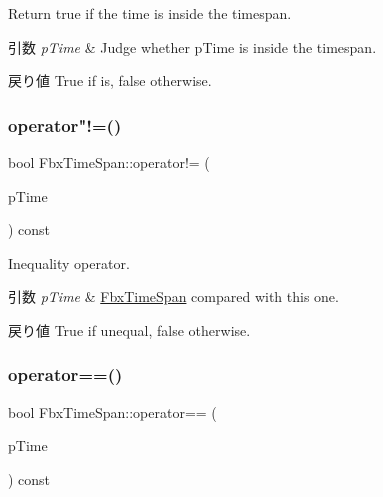 Return {\ttfamily true} if the time is inside the timespan. 
\begin{DoxyParams}{引数}
{\em p\+Time} & Judge whether p\+Time is inside the timespan. \\
\hline
\end{DoxyParams}
\begin{DoxyReturn}{戻り値}
{\ttfamily True} if is, {\ttfamily false} otherwise. 
\end{DoxyReturn}
\mbox{\label{class_fbx_time_span_a2dd0bd644b3c8eb5fb79cc2866ea0420}} 
\subsubsection{\texorpdfstring{operator"!=()}{operator!=()}}
{\footnotesize\ttfamily bool Fbx\+Time\+Span\+::operator!= (\begin{DoxyParamCaption}\item[{const \hyperlink{class_fbx_time_span}{Fbx\+Time\+Span} \&}]{p\+Time }\end{DoxyParamCaption}) const}

Inequality operator. 
\begin{DoxyParams}{引数}
{\em p\+Time} & \hyperlink{class_fbx_time_span}{Fbx\+Time\+Span} compared with this one. \\
\hline
\end{DoxyParams}
\begin{DoxyReturn}{戻り値}
{\ttfamily True} if unequal, {\ttfamily false} otherwise. 
\end{DoxyReturn}
\mbox{\label{class_fbx_time_span_a1dac810b3c1c123bd3055befb96e42f7}} 
\subsubsection{\texorpdfstring{operator==()}{operator==()}}
{\footnotesize\ttfamily bool Fbx\+Time\+Span\+::operator== (\begin{DoxyParamCaption}\item[{const \hyperlink{class_fbx_time_span}{Fbx\+Time\+Span} \&}]{p\+Time }\end{DoxyParamCaption}) const}


